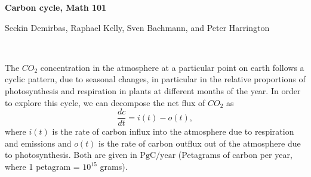 \documentclass{exam}
\begin{document}
\large{\textbf{Carbon cycle, Math 101}}

Seckin Demirbas, Raphael Kelly, Sven Bachmann, and Peter Harrington

\normalsize
\hrulefill

\



The $CO_2$ concentration in the atmosphere at a particular point on earth follows a cyclic pattern, due to seasonal changes, in particular in the relative proportions of photosynthesis and respiration in plants at different months of the year. In order to explore this cycle, we can decompose the net flux of $CO_2$ as $$\frac{dc}{dt}=i(t)-o(t),$$ where $i(t)$ is the rate of carbon influx into the atmosphere due to respiration and emissions and $o(t)$ is the rate of carbon outflux out of the atmosphere due to photosynthesis. Both are given in $\text{PgC}/\text{year}$ (Petagrams of carbon per year, where 1 petagram = $10^{15}$ grams).
\end{document}
